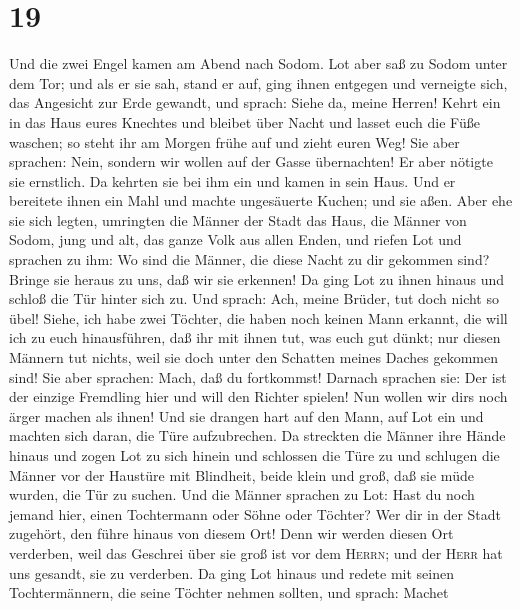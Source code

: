 \hypertarget{section-18}{%
\section{19}\label{section-18}}

 Und die zwei Engel kamen am Abend nach Sodom. Lot aber
saß zu Sodom unter dem Tor; und als er sie sah, stand er auf, ging ihnen
entgegen und verneigte sich, das Angesicht zur Erde gewandt,
 und sprach: Siehe da, meine Herren! Kehrt ein in das Haus
eures Knechtes und bleibet über Nacht und lasset euch die Füße waschen;
so steht ihr am Morgen frühe auf und zieht euren Weg! Sie aber sprachen:
Nein, sondern wir wollen auf der Gasse übernachten!  Er
aber nötigte sie ernstlich. Da kehrten sie bei ihm ein und kamen in sein
Haus. Und er bereitete ihnen ein Mahl und machte ungesäuerte Kuchen; und
sie aßen.  Aber ehe sie sich legten, umringten die Männer
der Stadt das Haus, die Männer von Sodom, jung und alt, das ganze Volk
aus allen Enden,  und riefen Lot und sprachen zu ihm: Wo
sind die Männer, die diese Nacht zu dir gekommen sind? Bringe sie heraus
zu uns, daß wir sie erkennen!  Da ging Lot zu ihnen hinaus
und schloß die Tür hinter sich zu.  Und sprach: Ach, meine
Brüder, tut doch nicht so übel!  Siehe, ich habe zwei
Töchter, die haben noch keinen Mann erkannt, die will ich zu euch
hinausführen, daß ihr mit ihnen tut, was euch gut dünkt; nur diesen
Männern tut nichts, weil sie doch unter den Schatten meines Daches
gekommen sind!  Sie aber sprachen: Mach, daß du
fortkommst! Darnach sprachen sie: Der ist der einzige Fremdling hier und
will den Richter spielen! Nun wollen wir dir\textquotesingle s noch
ärger machen als ihnen! Und sie drangen hart auf den Mann, auf Lot ein
und machten sich daran, die Türe aufzubrechen.  Da
streckten die Männer ihre Hände hinaus und zogen Lot zu sich hinein und
schlossen die Türe zu  und schlugen die Männer vor der
Haustüre mit Blindheit, beide klein und groß, daß sie müde wurden, die
Tür zu suchen.  Und die Männer sprachen zu Lot: Hast du
noch jemand hier, einen Tochtermann oder Söhne oder Töchter? Wer dir in
der Stadt zugehört, den führe hinaus von diesem Ort! 
Denn wir werden diesen Ort verderben, weil das Geschrei über sie groß
ist vor dem \textsc{Herrn}; und der \textsc{Herr} hat uns gesandt, sie
zu verderben.  Da ging Lot hinaus und redete mit seinen
Tochtermännern, die seine Töchter nehmen sollten, und sprach: Machet
